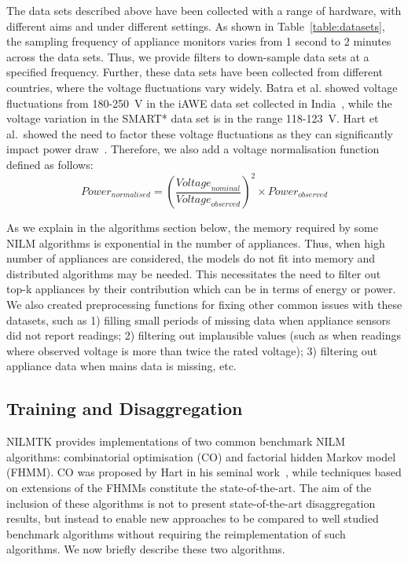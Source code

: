 \documentclass{sig-alternate}
\newcommand{\redcolor}[1]{\textcolor{red}{#1}}
\newcommand{\tabref}[1]{Table~\ref{#1}}
\begin{document}
\noindent
The data sets described above have been collected with a range of hardware, with different aims and under different settings. As shown in \tabref{table:datasets}, the sampling frequency of appliance monitors varies from 1 second to 2 minutes across the data sets.  Thus, we provide filters to down-sample data sets at a specified frequency. Further, these data sets have been collected from different countries, where the voltage fluctuations vary widely. Batra et al. showed voltage fluctuations from 180-250~V in the iAWE data set collected in India~\cite{iawe}, while the voltage variation in the SMART* data set is in the range 118-123~V. Hart et al.\ showed the need to factor these voltage fluctuations as they can significantly impact power draw~\cite{hart_1992}. Therefore, we also add a voltage normalisation function defined as follows: 
\begin{equation}
\textit{Power}_{\textit{normalised}} = 
\left(\frac{\textit{Voltage}_{\textit{nominal}}}{\textit{Voltage}_{\textit{observed}}}\right)^2 
\times \textit{Power}_{\textit{observed}}
\end{equation}

As we explain in the algorithms section below, the memory required by some NILM algorithms is exponential in the number of appliances. Thus, when high number of appliances are considered, the models do not fit into memory and distributed algorithms may be needed. This necessitates the need to filter out top-k appliances by their contribution which can be in terms of energy or power.  We also created preprocessing functions for fixing other common issues with these datasets, such as 1) filling small periods of missing data when appliance sensors did not report readings; 2) filtering out implausible values (such as when readings where observed voltage is more than twice the rated voltage); 3) filtering out appliance data when mains data is missing, etc.

\subsection{Training and Disaggregation}

\noindent
NILMTK provides implementations of two common benchmark NILM algorithms: combinatorial optimisation (CO) and factorial hidden Markov model (FHMM). CO was proposed by Hart in his seminal work~\cite{hart_1992}, while techniques based on extensions of the FHMMs constitute the state-of-the-art. The aim of the inclusion of these algorithms is not to present state-of-the-art disaggregation results, but instead to enable new approaches to be compared to well studied benchmark algorithms without requiring the reimplementation of such algorithms. We now briefly describe these two algorithms.
\end{document}
